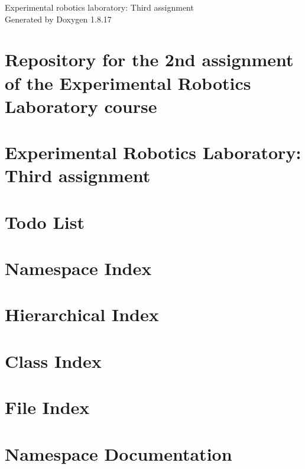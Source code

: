 \let\mypdfximage\pdfximage\def\pdfximage{\immediate\mypdfximage}\documentclass[twoside]{book}
\newcommand{\+}{\discretionary{\mbox{\scriptsize$\hookleftarrow$}}{}{}}
\newcommand{\clearemptydoublepage}{%
  \newpage{\pagestyle{empty}\cleardoublepage}%
}
\begin{document}
\hypersetup{pageanchor=false,
             bookmarksnumbered=true,
             pdfencoding=unicode
            }
\begin{titlepage}
\vspace*{7cm}
\begin{center}%
{\Large Experimental robotics laboratory\+: Third assignment }\\
\vspace*{1cm}
{\large Generated by Doxygen 1.8.17}\\
\end{center}
\end{titlepage}
\clearemptydoublepage
{}
\tableofcontents
\clearemptydoublepage
{}
\hypersetup{pageanchor=true}

\chapter{Repository for the 2nd assignment of the Experimental Robotics Laboratory course}
\label{md_erl2__r_e_a_d_m_e}

\chapter{Experimental Robotics Laboratory\+: Third assignment}
\label{md__r_e_a_d_m_e}

\chapter{Todo List}
\label{todo}

\chapter{Namespace Index}

\chapter{Hierarchical Index}

\chapter{Class Index}

\chapter{File Index}

\chapter{Namespace Documentation}







\end{document}
